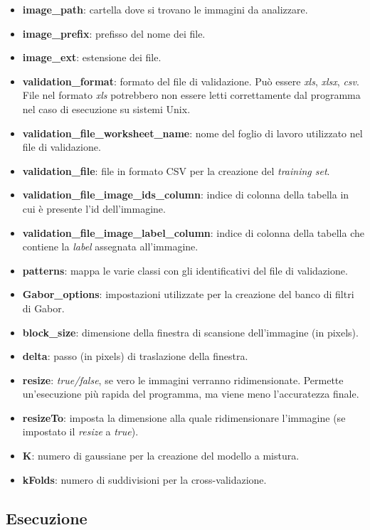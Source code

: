 \begin{itemize}
\item \textbf{image\_path}: cartella dove si trovano le immagini da analizzare.
\item \textbf{image\_prefix}: prefisso del nome dei file.
\item \textbf{image\_ext}: estensione dei file.
\item \textbf{validation\_format}: formato del file di validazione. Può essere \emph{xls}, \emph{xlsx}, \emph{csv}. File nel formato \emph{xls} potrebbero non essere letti correttamente dal programma nel caso di esecuzione su sistemi Unix. 
\item \textbf{validation\_file\_worksheet\_name}: nome del foglio di lavoro utilizzato nel file di validazione.
\item \textbf{validation\_file}: file in formato CSV per la creazione del \emph{training set}.
\item \textbf{validation\_file\_image\_ids\_column}: indice di colonna della tabella in cui è presente l'id dell'immagine.
\item \textbf{validation\_file\_image\_label\_column}: indice di colonna della tabella che contiene la \emph{label} assegnata all'immagine.
\item \textbf{patterns}: mappa le varie classi con gli identificativi del file di validazione.
\item \textbf{Gabor\_options}: impostazioni utilizzate per la creazione del banco di filtri di Gabor.
\item \textbf{block\_size}: dimensione della finestra di scansione dell'immagine (in pixels).
\item \textbf{delta}: passo (in pixels) di traslazione della finestra.
\item \textbf{resize}: \emph{true/false}, se vero le immagini verranno ridimensionate. Permette un'esecuzione più rapida del programma, ma viene meno l'accuratezza finale.
\item \textbf{resizeTo}: imposta la dimensione alla quale ridimensionare l'immagine (se impostato il \emph{resize} a \emph{true}).
\item \textbf{K}: numero di gaussiane per la creazione del modello a mistura.
\item \textbf{kFolds}: numero di suddivisioni per la cross-validazione.
\end{itemize}

\subsection{Esecuzione}

